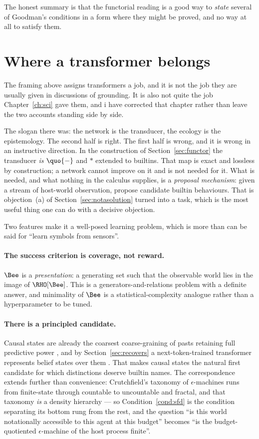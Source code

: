 \noindent
The honest summary is that the functorial reading is a good way to
\emph{state} several of Goodman's conditions in a form where they
might be proved, and no way at all to satisfy them.

\section{Where a transformer belongs}
\label{sec:transformer}

The framing above assigns transformers a job, and it is not the job
they are usually given in discussions of grounding.
It is also not quite the job Chapter~\ref{ch:sci} gave them, and
i have corrected that chapter rather than leave the two accounts
standing side by side.

The slogan there was: the network is the transducer, the ecology is
the epistemology.
The second half is right.
The first half is wrong, and it is wrong in an instructive
direction.
In the construction of Section~\ref{sec:functor} the transducer
\emph{is} $\quo{-}$ and $*$ extended to builtins.
That map is exact and lossless by construction; a network cannot
improve on it and is not needed for it.
What is needed, and what nothing in the calculus supplies, is a
\emph{proposal mechanism}: given a stream of host-world
observation, propose candidate builtin behaviours.
That is objection~(a) of Section~\ref{sec:notasolution} turned into
a task, which is the most useful thing one can do with a decisive
objection.

Two features make it a well-posed learning problem, which is more
than can be said for ``learn symbols from sensors''.

\paragraph{The success criterion is coverage, not reward.}
$\Bee$ is a \emph{presentation}: a generating set such that the
observable world lies in the image of $\RHO[\Bee]$.
This is a generators-and-relations problem with a definite answer,
and minimality of $\Bee$ is a statistical-complexity analogue
rather than a hyperparameter to be tuned.

\paragraph{There is a principled candidate.}
Causal states are already the coarsest coarse-graining of pasts
retaining full predictive power \cite{shalizi2001}, and by
Section~\ref{sec:recovers} a next-token-trained transformer
represents belief states over them \cite{shai2024}.
That makes causal states the natural first candidate for which
distinctions deserve builtin names.
The correspondence extends further than convenience: Crutchfield's
taxonomy of $\epsilon$-machines runs from finite-state through
countable to uncountable and fractal, and that taxonomy \emph{is} a
density hierarchy --- so Condition~\ref{cond:sfd} is the condition
separating its bottom rung from the rest, and the question ``is
this world notationally accessible to this agent at this budget''
becomes ``is the budget-quotiented $\epsilon$-machine of the host
process finite''.

